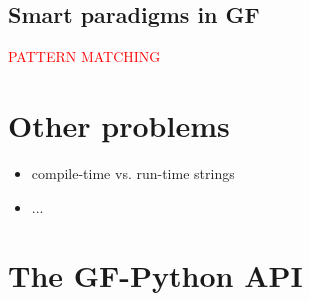 \documentclass{scrartcl}
\newcommand{\note}[1]{\textcolor{red}{\uppercase{#1}}}
\begin{document}
\subsection{Smart paradigms in GF}

\note{pattern matching}


\section{Other problems}
\begin{itemize}
\item compile-time vs. run-time strings
\item ...
\end{itemize}
\section{The GF-Python API}
\end{document}
